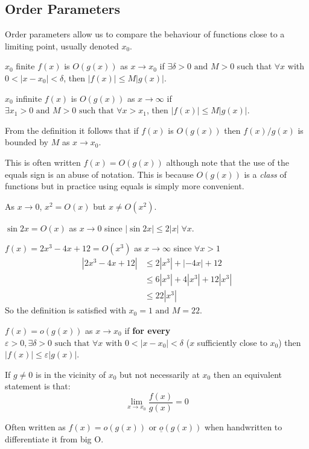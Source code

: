 \documentclass[../main.tex]{subfiles}
\begin{document}
\subsection{Order Parameters}
Order parameters allow us to compare the behaviour of functions close to a limiting point, usually denoted $x_0$.
\begin{definition}
  \begin{proofcases}
    \begin{case}{$x_0$ finite}
      $f(x)$ is $O(g(x))$ as $x \to x_0$ if $\exists \delta > 0 \text{ and } M > 0$ such that $\forall x$ with $0 < |x - x_0| < \delta$, then $|f(x)| \leq M |g(x)|$.
    \end{case}
    \begin{case}{$x_0$ infinite}
      $f(x)$ is $O(g(x))$ as $x \to \infty$ if $\exists x_1 > 0 \text{ and } M > 0 \text{ such that } \forall x > x_1$, then $|f(x)| \leq M|g(x)|$.
    \end{case}
  \end{proofcases}
\end{definition}
From the definition it follows that if $f(x)$ is $O(g(x))$ then $f(x)/g(x)$ is bounded by $M$ as $x \to x_0$.
\begin{remark}[Notation]
This is often written $f(x) = O(g(x))$ although note that the use of the equals sign is an abuse of notation.
This is because $O(g(x))$ is a \textit{class} of functions but in practice using equals is simply more convenient.
\end{remark}
\begin{example}
  As $x \to 0$, $x^2 = O(x)$ but $x \neq O(x^2)$.
\end{example}
\begin{example}
  $\sin 2x = O(x)$ as $x \to 0$ since $|\sin 2x| \leq 2|x|\;\forall x$.
\end{example}
\begin{example}
  $f(x) = 2x^3 - 4x + 12 = O(x^3)$ as $x \to \infty$ since $\forall x > 1$
  \begin{align*}
    |2x^3 - 4x + 12| &\leq 2|x^3| + |-4x| + 12 \\
                     &\leq 6|x^3| + 4|x^3| + 12|x^3| \\
                     &\leq 22|x^3|
  \end{align*}
  So the definition is satisfied with $x_0 = 1 \text{ and } M = 22$.
\end{example}
\begin{definition}
  $f(x) = o(g(x))$ as $x \to x_0$ if \textbf{for every} $\varepsilon > 0, \exists \delta > 0 \text{ such that } \forall x \text{ with } 0 < |x - x_0| < \delta$ ($x$ sufficiently close to $x_0$) then $|f(x)| \leq \varepsilon |g(x)|$.

  If $g \neq 0$ is in the vicinity of $x_0$ but not necessarily at $x_0$ then an equivalent statement is that:
  \[
    \lim_{x \to x_0} \frac{f(x)}{g(x)} = 0
  \]
\end{definition}
\begin{remark}[Notation]
  Often written as $f(x) = o(g(x))$ or $\underline{o}(g(x))$ when handwritten to differentiate it from big O.
\end{remark}
\end{document}
